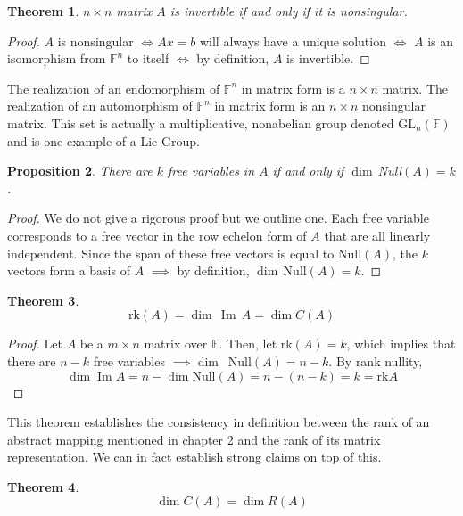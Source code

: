 \documentclass{article}
\DeclareMathOperator{\im}{Im}
\newtheorem{theorem}{Theorem}[section]
\newtheorem{proposition}[theorem]{Proposition}
\theoremstyle{remark}
\theoremstyle{definition}
\begin{document}
    \begin{theorem}
    $n \times n$ matrix $A$ is invertible if and only if it is nonsingular. 
    \end{theorem}
    \begin{proof}
    $A$ is nonsingular $\iff A x = b$ will always have a unique solution $\iff$ $A$ is an isomorphism from $\mathbb{F}^n$ to itself $\iff$ by definition, $A$ is invertible. 
    \end{proof}

    The realization of an endomorphism of $\mathbb{F}^n$ in matrix form is a $n \times n$ matrix. The realization of an automorphism of $\mathbb{F}^n$ in matrix form is an $n \times n$ nonsingular matrix. This set is actually a multiplicative, nonabelian group denoted GL$_n(\mathbb{F})$ and is one example of a Lie Group. 

    \begin{proposition}
    There are $k$ free variables in $A$ if and only if $\dim\,$Null$(A) = k$. 
    \end{proposition}
    \begin{proof}
    We do not give a rigorous proof but we outline one. Each free variable corresponds to a free vector in the row echelon form of $A$ that are all linearly independent. Since the span of these free vectors is equal to Null$(A)$, the $k$ vectors form a basis of $A$ $\implies$ by definition, $\dim\,$Null$(A) = k$.
    \end{proof}

    \begin{theorem}
    \[\text{rk}(A) = \dim \, \im \,A = \dim C(A)\]
    \end{theorem}

    \begin{proof}
    Let $A$ be a $m \times n$ matrix over $\mathbb{F}$. Then, let rk$(A) = k$, which implies that there are $n-k$ free variables $\implies \dim \,$ Null$(A) = n - k$. By rank nullity, 
    \[\dim \im{A} = n - \dim \text{Null}(A) = n - (n -k) = k = \text{rk} A \]
    \end{proof}

    This theorem establishes the consistency in definition between the rank of an abstract mapping mentioned in chapter 2 and the rank of its matrix representation. We can in fact establish strong claims on top of this. 

    \begin{theorem} 
    \[\dim C(A) = \dim R(A)\]
    \end{theorem}
\end{document}
